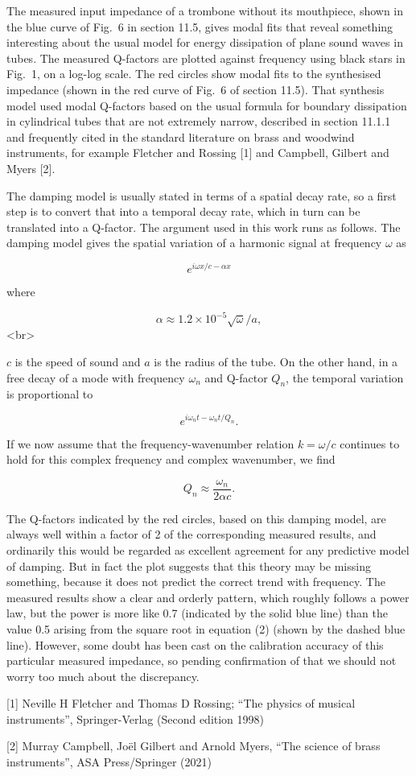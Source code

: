  The measured input impedance of a trombone without its mouthpiece, shown in 
  the blue curve of Fig.\ 6 in section 11.5, gives modal fits that reveal 
  something interesting about the usual model for energy dissipation of plane 
  sound waves in tubes. The measured Q-factors are plotted against frequency 
  using black stars in Fig.\ 1, on a log-log scale. The red circles show modal 
  fits to the synthesised impedance (shown in the red curve of Fig.\ 6 of 
  section 11.5). That synthesis model used modal Q-factors based on the usual 
  formula for boundary dissipation in cylindrical tubes that are not extremely 
  narrow, described in section 11.1.1 and frequently cited in the standard 
  literature on brass and woodwind instruments, for example Fletcher and 
  Rossing [1] and Campbell, Gilbert and Myers [2]. 

  The damping model is usually stated in terms of a spatial decay rate, so a 
  first step is to convert that into a temporal decay rate, which in turn can 
  be translated into a Q-factor. The argument used in this work runs as 
  follows. The damping model gives the spatial variation of a harmonic signal 
  at frequency $\omega$ as 

  $$e^{i\omega x/c-\alpha x} \tag{1}$$ 

  where 

  $$\alpha \approx 1.2 \times 10^{-5} \sqrt{\omega}/a, \tag{2}$$<br> 

  $c$ is the speed of sound and $a$ is the radius of the tube. On the other 
  hand, in a free decay of a mode with frequency $\omega_n$ and Q-factor $Q_n$, 
  the temporal variation is proportional to 

  $$e^{i \omega_n t -\omega_n t/Q_n} . \tag{3}$$ 

  If we now assume that the frequency-wavenumber relation $k=\omega/c$ 
  continues to hold for this complex frequency and complex wavenumber, we find 

  $$Q_n \approx \frac{\omega_n}{2 \alpha c} . \tag{4}$$ 

  The Q-factors indicated by the red circles, based on this damping model, are 
  always well within a factor of 2 of the corresponding measured results, and 
  ordinarily this would be regarded as excellent agreement for any predictive 
  model of damping. But in fact the plot suggests that this theory may be 
  missing something, because it does not predict the correct trend with 
  frequency. The measured results show a clear and orderly pattern, which 
  roughly follows a power law, but the power is more like 0.7 (indicated by the 
  solid blue line) than the value 0.5 arising from the square root in equation 
  (2) (shown by the dashed blue line). However, some doubt has been cast on the 
  calibration accuracy of this particular measured impedance, so pending 
  confirmation of that we should not worry too much about the discrepancy. 

  \sectionreferences{}[1] Neville H Fletcher and Thomas D Rossing; “The physics 
  of musical instruments”, Springer-Verlag (Second edition 1998) 

  [2] Murray Campbell, Joël Gilbert and Arnold Myers, “The science of brass 
  instruments”, ASA Press/Springer (2021) 